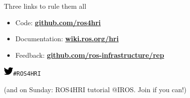 \documentclass[xcolor=table,aspectratio=169]{beamer}
\begin{document}
\begin{frame}{Three links to rule them all}
    \Large
\begin{itemize}
    \item Code: \textbf{\href{https://github.com/ros4hri/}{github.com/ros4hri}}
    \item Documentation: \textbf{\href{https://wiki.ros.org/hri}{wiki.ros.org/hri}}
    \item Feedback:\textbf{
        \href{https://github.com/ros-infrastructure/rep/pulls?q=is\%3Apr+is\%3Aopen+155}{github.com/ros-infrastructure/rep}}
    \end{itemize}

    \vspace{2em}
    \begin{center}
        \includegraphics[width=0.5cm]{style/twitter}\hspace{1em}\texttt{\#ROS4HRI}

        \footnotesize (and on Sunday: ROS4HRI tutorial @IROS. Join if you can!)
    \end{center}

\end{frame}

{
    \begin{frame}[plain]
%
%
%
%
%
%
%
    \end{frame}
}
\end{document}

